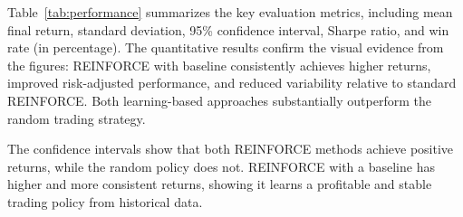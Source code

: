 \FloatBarrier %
\begin{table}[H]
\centering
\caption{Performance comparison across methods (averaged over 10 seeds).}
\label{tab:performance}
\end{table}

Table~\ref{tab:performance} summarizes the key evaluation metrics, including mean final return, 
standard deviation, 95\% confidence interval, Sharpe ratio, and win rate (in percentage). 
The quantitative results confirm the visual evidence from the figures: 
REINFORCE with baseline consistently achieves higher returns, improved risk-adjusted performance, 
and reduced variability relative to standard REINFORCE. 
Both learning-based approaches substantially outperform the random trading strategy.

The confidence intervals show that both REINFORCE methods achieve positive returns, while the random policy does not. REINFORCE with a baseline has higher and more consistent returns, showing it learns a profitable and stable trading policy from historical data.

\FloatBarrier %
